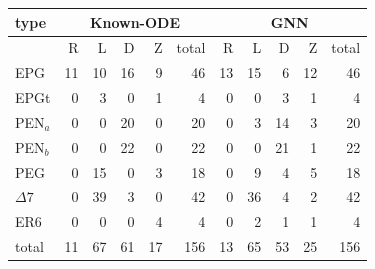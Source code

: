 \begin{tabular}{l rrrrr rrrrr}
\toprule
type & \multicolumn{5}{c}{Known-ODE} & \multicolumn{5}{c}{GNN} \\
\midrule
 & R & L & D & Z & total & R & L & D & Z & total \\
\midrule
EPG & 11 & 10 & 16 & 9 & 46 & 13 & 15 & 6 & 12 & 46 \\
EPGt & 0 & 3 & 0 & 1 & 4 & 0 & 0 & 3 & 1 & 4 \\
PEN$_a$ & 0 & 0 & 20 & 0 & 20 & 0 & 3 & 14 & 3 & 20 \\
PEN$_b$ & 0 & 0 & 22 & 0 & 22 & 0 & 0 & 21 & 1 & 22 \\
PEG & 0 & 15 & 0 & 3 & 18 & 0 & 9 & 4 & 5 & 18 \\
$\Delta 7$ & 0 & 39 & 3 & 0 & 42 & 0 & 36 & 4 & 2 & 42 \\
ER6 & 0 & 0 & 0 & 4 & 4 & 0 & 2 & 1 & 1 & 4 \\
\midrule
total & 11 & 67 & 61 & 17 & 156 & 13 & 65 & 53 & 25 & 156 \\
\bottomrule
\end{tabular}
